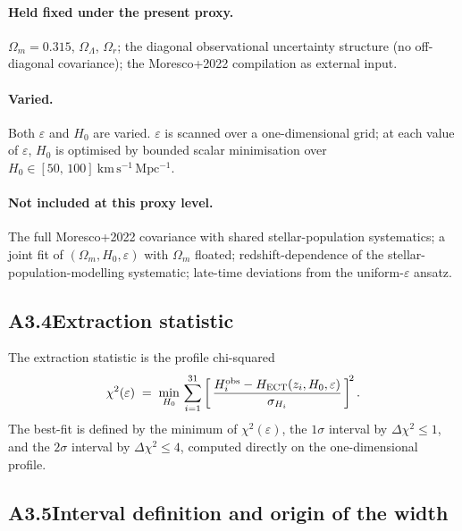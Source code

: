 \paragraph{Held fixed under the present proxy.}
$\Omega_m = 0.315$, $\Omega_\Lambda$, $\Omega_r$; the diagonal
observational uncertainty structure (no off-diagonal covariance);
the Moresco+2022 compilation as external input.

\paragraph{Varied.}
Both $\varepsilon$ and $H_0$ are varied. $\varepsilon$ is scanned
over a one-dimensional grid; at each value of $\varepsilon$,
$H_0$ is optimised by bounded scalar minimisation over
$H_0 \in [50,\,100]~\mathrm{km\,s^{-1}\,Mpc^{-1}}$.

\paragraph{Not included at this proxy level.}
The full Moresco+2022 covariance with shared stellar-population
systematics; a joint fit of $(\Omega_m, H_0, \varepsilon)$ with
$\Omega_m$ floated; redshift-dependence of the
stellar-population-modelling systematic; late-time deviations from
the uniform-$\varepsilon$ ansatz.

\subsection*{A3.4\quad Extraction statistic}

The extraction statistic is the profile chi-squared
\begin{equation}
\chi^2(\varepsilon) \;=\;
\min_{H_0}\,\sum_{i=1}^{31}
\left[\,\frac{H_i^{\rm obs} - H_{\rm ECT}(z_i, H_0, \varepsilon)}
{\sigma_{H_i}}\,\right]^{\!2}.
\label{eq:chi2_cc_eps}
\end{equation}
The best-fit is defined by the minimum of $\chi^2(\varepsilon)$,
the $1\sigma$ interval by $\Delta\chi^2 \leq 1$, and the $2\sigma$
interval by $\Delta\chi^2 \leq 4$, computed directly on the
one-dimensional profile.

\subsection*{A3.5\quad Interval definition and origin of the width}

